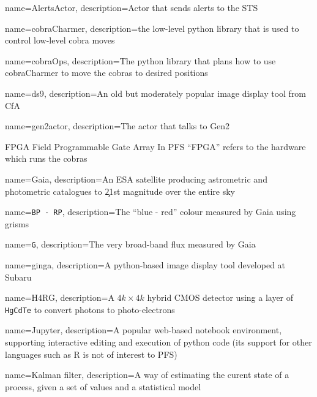 %
%
%
%
%
{
  name={AlertsActor},
  description={Actor that sends alerts to the STS}
}

{
  name={cobraCharmer},
  description={the low-level python library that is used to control low-level cobra moves}
}

{
  name={cobraOps},
  description={The python library that plans how to use \gls{cobraCharmer} to move
  the cobras to desired positions}
}

{
  name={ds9},
  description={An old but moderately popular image display tool from CfA}
}

{
  name={gen2actor},
  description={The \MHS actor that talks to \gls{Gen2}}
}

{FPGA}
{Field Programmable Gate Array}
{In PFS ``FPGA'' refers to the hardware which runs the cobras}


{
  name={Gaia},
  description={An ESA satellite producing astrometric and photometric catalogues to \c 21st
  magnitude over the entire sky}
}

{
  name={\texttt{BP - RP}},
  description={The ``blue - red'' colour measured by \gls{Gaia} using grisms}
}

{
  name={\texttt{G}},
  description={The very broad-band flux measured by \gls{Gaia}}
}

{
  name={ginga},
  description={A python-based image display tool developed at Subaru}
}

{
   name={H4RG},
   description={A $4k\times 4k$ hybrid CMOS detector using a layer of \texttt{HgCdTe} to convert photons
   to photo-electrons}
}

{
  name={Jupyter},
  description={A popular web-based notebook environment, supporting interactive editing
    and execution of python code (its support for other languages such as R is not of interest to PFS)}
}

{
   name={Kalman filter},
   description={A way of estimating the curent state of a process, given a set of values and
   a statistical model}
}

